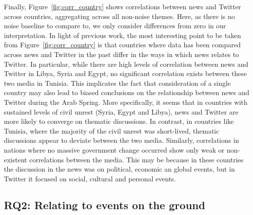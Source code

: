 Finally, Figure~\ref{fig:corr_country}  shows correlations between news and Twitter across countries, aggregating across all non-noise themes.  Here, as there is no noise baseline to compare to, we only consider differences from zero in our interpretation.  In light of previous work, the most interesting point to be taken from Figure~\ref{fig:corr_country} is that countries where data has been compared across news and Twitter in the past differ in the ways in which news relates to Twitter. In particular, while there are high levels of correlation between news and Twitter in Libya, Syria and Egypt, no significant correlation exists between these two media in Tunisia.  This implicates the fact that consideration of a single country may also lead to biased conclusions on the relationship between news and Twitter during the Arab Spring. More specifically, it seems that in countries with sustained levels of civil unrest (Syria, Egypt and Libya), news and Twitter are more likely to converge on thematic discussions. In contrast, in countries like Tunisia, where the majority of the civil unrest was short-lived, thematic discussions appear to deviate between the two media. Similarly, correlations in nations where no massive government change occurred show only weak or non-existent correlations between the media.  This may be because in these countries the discussion in the news was on political, economic an global events, but in Twitter it focused on social, cultural and personal events.

\subsection{{\bf RQ2:} Relating to events on the ground}

